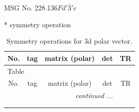 \documentclass[fleqn,8pt]{jsarticle}
\begin{document}
\setcounter{MaxMatrixCols}{32}

\renewcommand{\tablename}{Table~}
\renewcommand{\figurename}{Figure~}
\begin{center}
\LARGE
MSG No. 228.136\quad$Fd'\bar{3}'c$
\end{center}
* symmetry operation
\renewcommand{\arraystretch}{1.3}
\begin{longtable}{ccccc}
\caption{Symmetry operations for 3d polar vector.}
 \\
 \hline \hline
No. & tag & matrix (polar) & det & TR \\ \hline \endfirsthead

\multicolumn{4}{l}{\tablename\ \thetable{}} \\
 \hline \hline
No. & tag & matrix (polar) & det & TR \\ \hline \endhead

 \hline \hline
\multicolumn{4}{r}{\footnotesize\it continued ...} \\ \endfoot

 \hline \hline
\multicolumn{4}{r}{} \\ \endlastfoot


\end{longtable}
\end{document}
